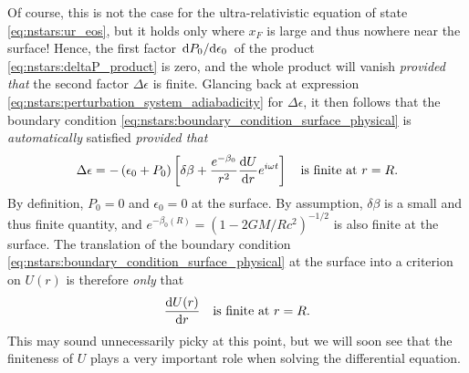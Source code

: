 Of course, this is not the case for the ultra-relativistic equation of state \eqref{eq:nstars:ur_eos}, but it holds only where $x_F$ is large and thus nowhere near the surface!
\fi
Hence, the first factor $\odv{P_0}/{\epsilon_0}$ of the product \eqref{eq:nstars:deltaP_product} is zero, and the whole product will vanish \emph{provided that} the second factor $\Delta \epsilon$ is finite.
Glancing back at expression \eqref{eq:nstars:perturbation_system_adiabadicity} for $\Delta \epsilon$, it then follows that the boundary condition \eqref{eq:nstars:boundary_condition_surface_physical} is \emph{automatically} satisfied \emph{provided that}
\begin{equation}
	\Delta \epsilon = - \left( \epsilon_0 + P_0 \right) \left[ \delta\beta + \frac{e^{-\beta_0}}{r^2} \odv{U}{r} e^{i \omega t} \right] \quad \text{is finite at $r=R$}.
\end{equation}
By definition, $P_0 = 0$ and $\epsilon_0=0$ at the surface.
By assumption, $\delta\beta$ is a small and thus finite quantity, and $e^{-\beta_0(R)} = \left( 1 - 2 G M / R c^2 \right)^{-1/2}$ is also finite at the surface.
The translation of the boundary condition \eqref{eq:nstars:boundary_condition_surface_physical} at the surface into a criterion on $U(r)$ is therefore \emph{only} that
\begin{equation}
	\odv{U(r)}{r} \quad \text{is finite at $r=R$}.
\label{eq:nstars:boundary_condition_surface_mathematical}
\end{equation}
This may sound unnecessarily picky at this point, but we will soon see that the finiteness of $U$ plays a very important role when solving the differential equation.

